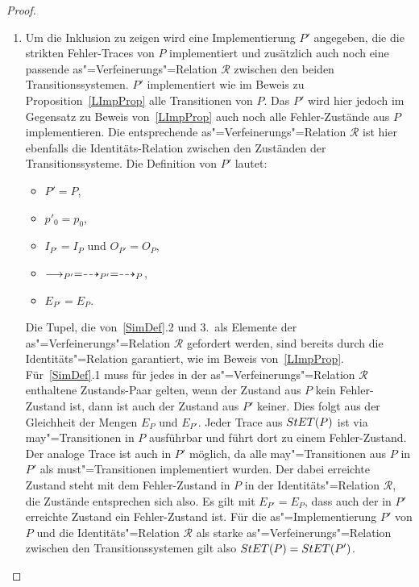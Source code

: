 \begin{proof}\mbox{}
  \begin{enumerate}
    \item Um die Inklusion zu zeigen wird eine Implementierung $P'$ angegeben,
      die die strikten Fehler-Traces von $P$ implementiert und zusätzlich auch
      noch eine passende as"=Verfeinerungs"=Relation $\mathcal{R}$ zwischen den
      beiden Transitionssystemen. $P'$ implementiert wie im Beweis zu
      Proposition~\ref{LImpProp} alle Transitionen von $P$. Das $P'$ wird hier
      jedoch im Gegensatz zu Beweis von~\ref{LImpProp} auch noch alle
      Fehler-Zustände aus $P$ implementieren. Die entsprechende
      as"=Verfeinerungs"=Relation $\mathcal{R}$ ist hier ebenfalls die
      Identitäts-Relation zwischen den Zuständen der Transitionssysteme. Die
      Definition von $P'$ lautet:
      \begin{itemize}
        \item $P'=P$,
        \item $p'_0=p_0$,
        \item $I_{P'}=I_P$ und $O_{P'}=O_P$,
        \item $\must _{P'} =\may _{P'} = \may _P$,
        \item $E_{P'}=E_P$.
      \end{itemize}
      Die Tupel, die von~\ref{SimDef}.2 und 3.\ als Elemente der
      as"=Verfeinerungs"=Relation $\mathcal{R}$ gefordert werden, sind bereits
      durch die Identitäts"=Relation garantiert, wie im Beweis
      von~\ref{LImpProp}. Für~\ref{SimDef}.1 muss für jedes in der
      as"=Verfeinerungs"=Relation $\mathcal{R}$ enthaltene Zustands-Paar
      gelten, wenn der Zustand aus $P$ kein Fehler-Zustand ist, dann ist auch
      der Zustand aus $P'$ keiner. Dies folgt aus der Gleichheit der Mengen
      $E_P$ und $E_{P'}$. Jeder Trace aus $StET (P)$ ist via may"=Transitionen
      in $P$ ausführbar und führt dort zu einem Fehler-Zustand. Der analoge
      Trace ist auch in $P'$ möglich, da alle may"=Transitionen aus $P$ in $P'$
      als must"=Transitionen implementiert wurden. Der dabei erreichte Zustand
      steht mit dem Fehler-Zustand in $P$ in der Identitäts"=Relation
      $\mathcal{R}$, die Zustände entsprechen sich also. Es gilt mit
      $E_{P'}=E_P$, dass auch der in $P'$ erreichte Zustand ein Fehler-Zustand
      ist. Für die as"=Implementierung $P'$ von $P$ und die
      Identitäts"=Relation $\mathcal{R}$ als starke as"=Verfeinerungs"=Relation
      zwischen den Transitionssystemen gilt also $StET (P) =StET (P')$.

\end{enumerate}
\end{proof}

